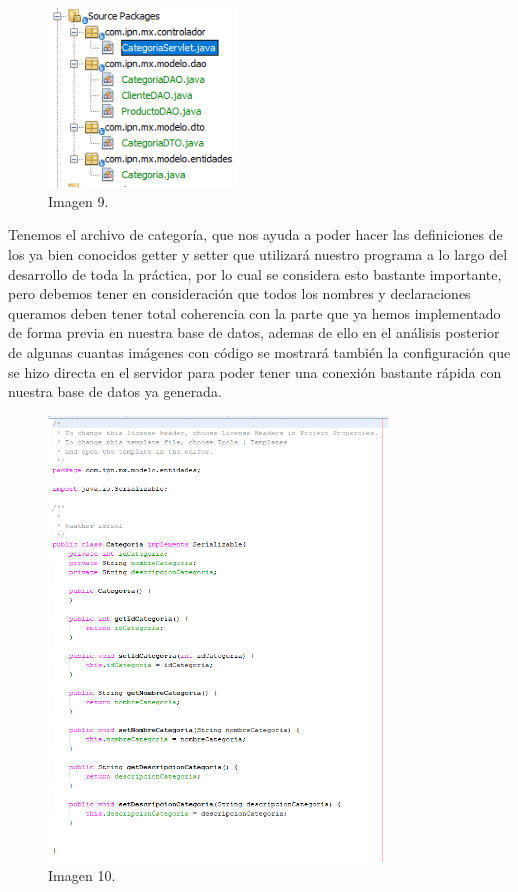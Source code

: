 \documentclass[10pt,a4paper]{article}
\begin{document}
\begin{figure}[h]
\centering
\includegraphics[width=5cm]{9}
\caption{Imagen 9.}
\label{fig:figure1}
\end{figure}

Tenemos el archivo de categoría, que nos ayuda a poder hacer las definiciones de los ya bien conocidos getter y setter que utilizará nuestro programa a lo largo del desarrollo de toda la práctica, por lo cual se considera esto bastante importante, pero debemos tener en consideración que todos los nombres y declaraciones queramos deben tener total coherencia con la parte que ya hemos implementado de forma previa en nuestra base de datos, ademas de ello en el análisis posterior de algunas cuantas imágenes con código se mostrará también la configuración que se hizo directa en el servidor para poder tener una conexión bastante rápida con nuestra base de datos ya generada.
\begin{figure}[h]
\centering
\includegraphics[width=9cm]{Categoria}
\caption{Imagen 10.}
\label{fig:figure1}
\end{figure}
\end{document}
